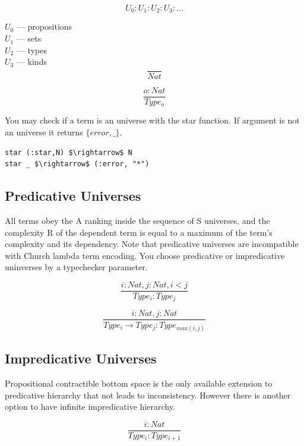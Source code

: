 \documentclass[11pt,oneside]{article}
\begin{document}
$$
U_0 : U_1 : U_2 : U_3 : ...
$$

$U_0$ --- propositions\\
$U_1$ --- sets\\
$U_2$ --- types\\
$U_3$ --- kinds\\

\begin{equation}
\tag{I}
\dfrac
{}
{Nat}
\end{equation}

\begin{equation}
\tag{S}
\dfrac
{o : Nat}
{Type_o}
\end{equation}

You may check if a term is an universe with the star function.
If argument is not an universe it returns $\{error,\_\}$.

\begin{lstlisting}[mathescape=true]
star (:star,N) $\rightarrow$ N
star _ $\rightarrow$ (:error, "*")
\end{lstlisting}

\subsection{Predicative Universes}

All terms obey the A ranking inside the sequence of S universes,
and the complexity R of the dependent term is equal to a maximum of
the term's complexity and its dependency.
Note that predicative universes are incompatible with Church lambda term encoding.
You choose predicative or impredicative uninverses by a typechecker parameter.

\[
\tag{$A_1$}
\dfrac{i: Nat, j: Nat, i < j}{Type_i : Type_j}
\]

\[
\tag{$R_1$}
\dfrac{i : Nat, j : Nat}{Type_i \rightarrow Type_j : Type_{max(i,j)} }
\]

\subsection{Impredicative Universes}
Propositional contractible bottom space is the only
available extension to predicative hierarchy that not leads to inconsistency.
However there is another option to have infinite
impredicative hierarchy.

\begin{equation}
\tag{$A_2$}
\dfrac
{i: Nat}
{Type_i : Type_{i+1}}
\end{equation}
\end{document}
